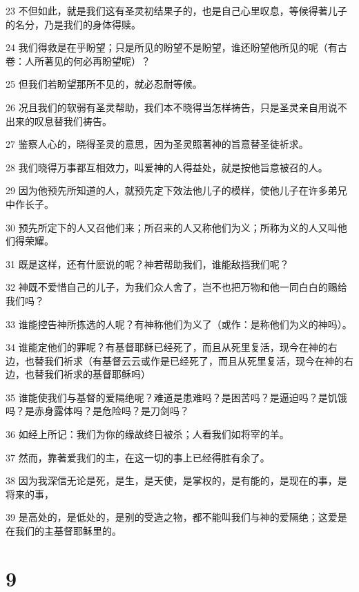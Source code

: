 \par 23 不但如此，就是我们这有圣灵初结果子的，也是自己心里叹息，等候得著儿子的名分，乃是我们的身体得赎。
\par 24 我们得救是在乎盼望；只是所见的盼望不是盼望，谁还盼望他所见的呢（有古卷：人所著见的何必再盼望呢）？
\par 25 但我们若盼望那所不见的，就必忍耐等候。
\par 26 况且我们的软弱有圣灵帮助，我们本不晓得当怎样祷告，只是圣灵亲自用说不出来的叹息替我们祷告。
\par 27 鉴察人心的，晓得圣灵的意思，因为圣灵照著神的旨意替圣徒祈求。
\par 28 我们晓得万事都互相效力，叫爱神的人得益处，就是按他旨意被召的人。
\par 29 因为他预先所知道的人，就预先定下效法他儿子的模样，使他儿子在许多弟兄中作长子。
\par 30 预先所定下的人又召他们来；所召来的人又称他们为义；所称为义的人又叫他们得荣耀。
\par 31 既是这样，还有什麽说的呢？神若帮助我们，谁能敌挡我们呢？
\par 32 神既不爱惜自己的儿子，为我们众人舍了，岂不也把万物和他一同白白的赐给我们吗？
\par 33 谁能控告神所拣选的人呢？有神称他们为义了（或作：是称他们为义的神吗）。
\par 34 谁能定他们的罪呢？有基督耶稣已经死了，而且从死里复活，现今在神的右边，也替我们祈求（有基督云云或作是已经死了，而且从死里复活，现今在神的右边，也替我们祈求的基督耶稣吗）
\par 35 谁能使我们与基督的爱隔绝呢？难道是患难吗？是困苦吗？是逼迫吗？是饥饿吗？是赤身露体吗？是危险吗？是刀剑吗？
\par 36 如经上所记：我们为你的缘故终日被杀；人看我们如将宰的羊。
\par 37 然而，靠著爱我们的主，在这一切的事上已经得胜有余了。
\par 38 因为我深信无论是死，是生，是天使，是掌权的，是有能的，是现在的事，是将来的事，
\par 39 是高处的，是低处的，是别的受造之物，都不能叫我们与神的爱隔绝；这爱是在我们的主基督耶稣里的。

\chapter{9}

